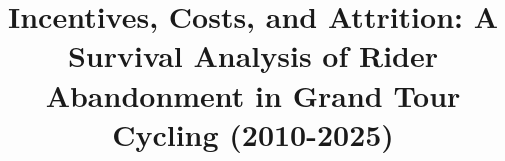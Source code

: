 \documentclass[11pt,reqno, usenames]{report}
\title{Incentives, Costs, and Attrition: A Survival Analysis of Rider Abandonment in Grand Tour Cycling (2010-2025)}
\begin{document}
\maketitle

\clearpage
\pagestyle{fancy}
\setcounter{page}{1}


\makeatletter
\let\ps@plain\ps@fancy
\makeatother



\newpage

















\newpage

\renewcommand{\bibname}{Bibliography}
\printbibliography
\newpage


\end{document}
